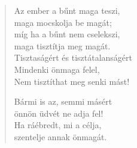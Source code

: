 \begin{verse}
 Az ember a bűnt maga teszi,\\
maga mocskolja be magát;\\
míg ha a bűnt nem cselekszi,\\
maga tisztítja meg magát.\\
Tisztaságért és tisztátalanságért\\
Mindenki önmaga felel,\\
Nem tisztíthat meg senki mást!

 Bármi is az, semmi másért\\
önnön üdvét ne adja fel!\\
Ha ráébredt, mi a célja,\\
szentelje annak önmagát.

\end{verse}
